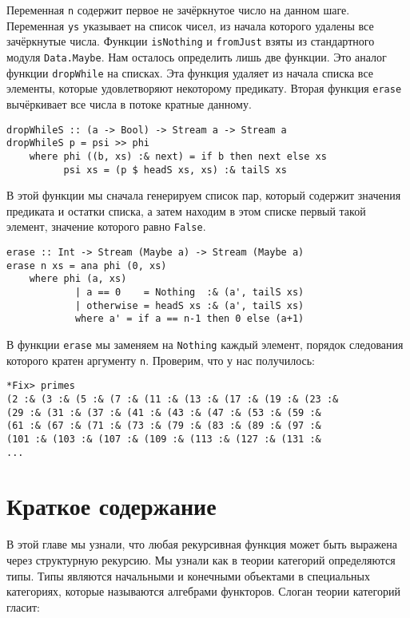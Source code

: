 Переменная \texttt{n} содержит первое не зачёркнутое число на данном
шаге. Переменная \texttt{ys} указывает на список чисел, из начала
которого удалены все зачёркнутые числа. Функции \texttt{isNothing} и
\texttt{fromJust} взяты из стандартного модуля \texttt{Data.Maybe}. Нам
осталось определить лишь две функции. Это аналог функции
\texttt{dropWhile} на списках. Эта функция удаляет из начала списка все
элементы, которые удовлетворяют некоторому предикату. Вторая функция
\texttt{erase} вычёркивает все числа в потоке кратные данному.

\begin{verbatim}
dropWhileS :: (a -> Bool) -> Stream a -> Stream a
dropWhileS p = psi >> phi 
    where phi ((b, xs) :& next) = if b then next else xs
          psi xs = (p $ headS xs, xs) :& tailS xs
\end{verbatim}

В этой функции мы сначала генерируем список пар, который содержит
значения предиката и остатки списка, а затем находим в этом списке
первый такой элемент, значение которого равно \texttt{False}.

\begin{verbatim}
erase :: Int -> Stream (Maybe a) -> Stream (Maybe a)
erase n xs = ana phi (0, xs)
    where phi (a, xs) 
            | a == 0    = Nothing  :& (a', tailS xs)
            | otherwise = headS xs :& (a', tailS xs)
            where a' = if a == n-1 then 0 else (a+1)
\end{verbatim}

В функции \texttt{erase} мы заменяем на \texttt{Nothing} каждый элемент,
порядок следования которого кратен аргументу \texttt{n}. Проверим, что у
нас получилось:

\begin{verbatim}
*Fix> primes 
(2 :& (3 :& (5 :& (7 :& (11 :& (13 :& (17 :& (19 :& (23 :& 
(29 :& (31 :& (37 :& (41 :& (43 :& (47 :& (53 :& (59 :& 
(61 :& (67 :& (71 :& (73 :& (79 :& (83 :& (89 :& (97 :& 
(101 :& (103 :& (107 :& (109 :& (113 :& (127 :& (131 :&
...
\end{verbatim}

\section{Краткое содержание}

В этой главе мы узнали, что любая рекурсивная функция может быть
выражена через структурную рекурсию. Мы узнали как в теории категорий
определяются типы. Типы являются начальными и конечными объектами в
специальных категориях, которые называются алгебрами функторов. Слоган
теории категорий гласит:

